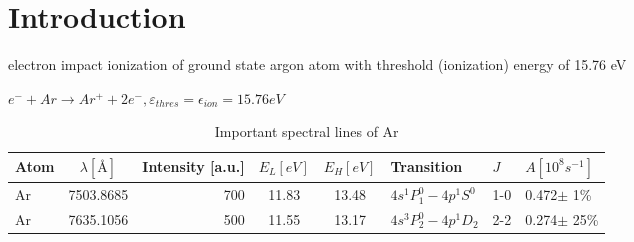 \newcommand{\notenumber}{2019-xx}
\newcommand{\notetitle}{\ac{bpcm} for intense electron beam driven plasmas in Argon*}
\newcommand{\noteauthors}{P.~E.~Adamson}
\newcommand{\noteabstract}{A \ac{bpcm} is developed for intense electron
beam driven plasmas in Ar.  This work is part of an effort to 
develop \acp{prm} for a DTRA- and NRL-funded effort to update ICEPIC and MEEC++ to
model \ac{sgemp}.}
\newcommand{\notesponsor}{DTRA/RD-NTE 6.2 program}




\section{Introduction}

electron impact ionization of ground state argon atom with
threshold (ionization) energy of 15.76 eV

$e^− + Ar \rightarrow Ar^+ + 2e^− , \varepsilon_{thres} = \epsilon_{ion} = 15.76 eV$

\begin{table}
\caption{Important spectral lines of Ar}
\begin{tabular}{lcrcclll}
\hline\hline
Atom & $\lambda [\si{\angstrom}]$ & Intensity [a.u.] & $E_L [eV]$ & $E_H [eV]$ & Transition & $J$ & $A [10^8 s^{-1}]$ \\
\hline
Ar & 7503.8685 & 700 & 11.83 & 13.48 & $4s^1P^0_1-4p^1S^0$ & 1-0 & 0.472$\pm$ 1\% \\
Ar & 7635.1056 & 500 & 11.55 & 13.17 & $4s^3P^0_2-4p^1D_2$ & 2-2 & 0.274$\pm$ 25\% \\
\hline\hline 
\end{tabular}
\end{table}


